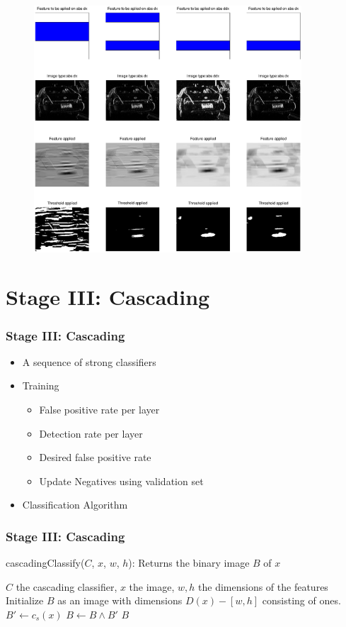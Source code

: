 \documentclass{beamer}
\begin{document}
\frame
{
	\begin{figure}[!ht]
	\centering
	\includegraphics[width=10cm]{../report/img/strongClassifier_layer2_img14}
	\label{fig:strongclassify}
	\end{figure}
}

\section{Stage III: Cascading}
\frame
{
  \frametitle{Stage III: Cascading}
	
  \begin{itemize}
  \item <+-| alert@+> A sequence of strong classifiers
  \item <+-| alert@+> Training
  \begin{itemize}
  	\item False positive rate per layer
  	\item Detection rate per layer
  	\item Desired false positive rate
  	\item Update Negatives using validation set
  \end{itemize}
  \item <+-| alert@+> Classification Algorithm
  \end{itemize}
}

\frame
{
  \frametitle{Stage III: Cascading}
  \begin{algorithm}[H]
  	\caption{cascadingClassify($C$, $x$, $w$, $h$): Returns the binary image $B$ of $x$}
  	\begin{algorithmic}[1]
  	\REQUIRE $C$ the cascading classifier, $x$ the image, $w,h$ the dimensions of the features
  	\medskip
  	\STATE Initialize $B$ as an image with dimensions $D(x) - [w,h]$ consisting of ones.
  		\STATE $B' \leftarrow c_s(x)$
  		\STATE $B \leftarrow B \land B'$
  	\ENDFOR
  	\RETURN $B$
  	\end{algorithmic}
  \label{alg:casc}
  \end{algorithm}
}
\end{document}
